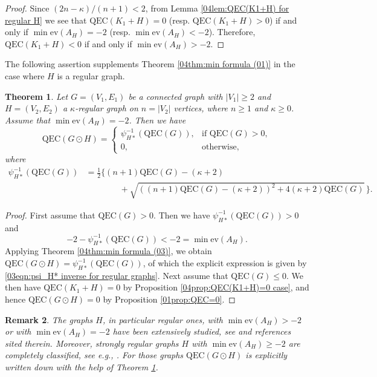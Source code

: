 \documentclass[12pt,a4paper]{article}
\newtheorem{theorem}{Theorem}[section]
\newtheorem{remark}[theorem]{Remark}
\newcommand{\1}{{\bm 1}}
\numberwithin{equation}{section}
\begin{document}
\begin{proof}
Since $(2n-\kappa)/(n+1)<2$, from
Lemma \ref{04lem:QEC(K1+H) for regular H} we see that
$\mathrm{QEC}(K_1+H)=0$ (resp. $\mathrm{QEC}(K_1+H)>0$)
if and only if $\min\mathrm{ev}(A_H)=-2$
(resp. $\min\mathrm{ev}(A_H)<-2$).
Therefore, $\mathrm{QEC}(K_1+H)<0$
if and only if $\min\mathrm{ev}(A_H)>-2$.
\end{proof}

The following assertion supplements Theorem \ref{04thm:min formula (01)}
in the case where $H$ is a regular graph.

\begin{theorem}\label{04thm:QEC for H with minev=-2}
Let $G=(V_1,E_1)$ be a connected graph with $|V_1|\ge2$
and $H=(V_2,E_2)$ a $\kappa$-regular graph on $n=|V_2|$
vertices, where $n\ge1$ and $\kappa\ge0$.
Assume that $\min \mathrm{ev}(A_H)= -2$.
Then we have
\[
\mathrm{QEC}(G\odot H)
=\begin{cases}
\psi_{H*}^{-1}(\mathrm{QEC}(G)), & \text{if $\mathrm{QEC}(G)>0$}, \\
0, & \text{otherwise},
\end{cases}
\]
where
%
\begin{align*}
\psi_{H*}^{-1}(\mathrm{QEC}(G))
&=\frac{1}{2}\Big\{(n+1)\mathrm{QEC}(G)-(\kappa+2)
\\
&\qquad\qquad +\sqrt{
 ((n+1)\mathrm{QEC}(G)-(\kappa+2))^2+4(\kappa+2)\mathrm{QEC}(G)}\, \Big\}.
\end{align*}
\end{theorem}

\begin{proof}
First assume that $\mathrm{QEC}(G)>0$.
Then we have $\psi_{H*}^{-1}(\mathrm{QEC}(G))>0$ and 
\[
-2-\psi_{H*}^{-1}(\mathrm{QEC}(G))<-2
=\min \mathrm{ev}(A_H).
\]
Applying Theorem \ref{04thm:min formula (03)}, we obtain
$\mathrm{QEC}(G\odot H)=\psi_{H*}^{-1}(\mathrm{QEC}(G))$,
of which the explicit expression is given by
\eqref{03eqn:psi_H* inverse for regular graphs}.
Next assume that $\mathrm{QEC}(G)\le0$.
We then have $\mathrm{QEC}(K_1+H)=0$
by Proposition \ref{04prop:QEC(K1+H)=0 case},
and hence $\mathrm{QEC}(G\odot H)=0$
by Proposition \ref{01prop:QEC=0}.
\end{proof}

\begin{remark}\normalfont
The graphs $H$, in particular regular ones, with $\min\mathrm{ev}(A_H)>-2$
or with $\min\mathrm{ev}(A_H)=-2$ have been extensively
studied, see \cite{Cvetkovic-Rowlinson-Simic2004} and references sited therein.
Moreover, strongly regular graphs $H$ with 
$\min\mathrm{ev}(A_H)\ge -2$ are completely classified,
see e.g., \cite{Brouwer-Cohen-Neumaier1989,Brouwer-Haemers2012}.
For those graphs $\mathrm{QEC}(G\odot H)$ is
explicitly written down with the help of
Theorem \ref{04thm:QEC for H with minev=-2}.
\end{remark}
\end{document}
